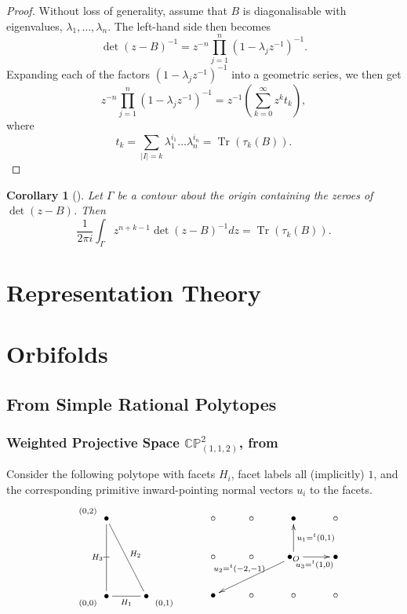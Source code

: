\documentclass{article}
\newtheorem{corollary}[theorem]{Corollary}
\newcommand{\PP}{\mathbb{P}}
\newcommand{\CC}{\mathbb{C}}
\newcommand{\pbrackets}[1]{\left( #1 \right)}
\DeclareMathOperator{\Tr}{Tr}
\begin{document}
	\begin{proof}
		Without loss of generality, assume that $B$ is diagonalisable with eigenvalues, $\lambda_{1}, \ldots, \lambda_{n}$. The left-hand side then becomes
		\begin{equation*}
			\det(z - B)^{-1} = z^{-n}\prod\limits_{j = 1}^{n}(1 - \lambda_{j}z^{-1})^{-1}.
		\end{equation*}
		Expanding each of the factors $(1 - \lambda_{j}z^{-1})^{-1}$ into a geometric series, we then get
		\begin{equation*}
			z^{-n}\prod\limits_{j = 1}^{n}(1 - \lambda_{j}z^{-1})^{-1} = z^{-1}\left( \sum_{k = 0}^{\infty} z^{k}t_{k} \right),
		\end{equation*}
		where
		\begin{equation*}
			t_{k} = \sum_{|I| = k} \lambda_{1}^{i_{1}}\ldots\lambda_{n}^{i_{n}} = \Tr\pbrackets{\tau_{k}(B)}.
		\end{equation*}
	\end{proof}
	
	\begin{corollary}[\cite{CanasdaSilva1996}]\label{residue:4}
		Let $\Gamma$ be a contour about the origin containing the zeroes of $\det(z - B)$. Then
		\begin{equation*}
			\frac{1}{2\pi i} \int_{\Gamma} z^{n + k -1} \det(z - B)^{-1} dz = \Tr\pbrackets{\tau_{k}(B)}.
		\end{equation*}
	\end{corollary}

	\section{Representation Theory}
	
	\section{Orbifolds}
	\subsection{From Simple Rational Polytopes}
	\subsubsection{Weighted Projective Space $\CC\PP^2_{(1,1,2)}$, from \cite{Holm2012}}
	Consider the following polytope with facets $H_i$, facet labels all (implicitly) $1$, and the corresponding primitive inward-pointing normal vectors $u_i$ to the facets.{\tiny
		\[
		\xymatrix{ 
			\ar@{}[r]^{(0,2)}&\bullet\ar@{-}[dd]_{H_3}\ar@{-}[rdd]^{H_2}&&\\
			&-&&\\
			\ar@{}[r]_{(0,0)}&\bullet\ar@{-}[r]_{H_1}&\bullet \ar@{}[r]_{(0,1)}&
		}
		\ \ \ \ \ \ 
		\xymatrix{
			\circ&\circ&\bullet&\circ\\
			\circ&\circ&\bullet_O\ar[u]_{u_1=^t(0,1) }\ar[r]_{u_3=^t(1,0) }\ar[dll]_{u_2=^t(-2,-1)}&\bullet\\
			\bullet&\circ&\circ&\circ
		}
		\]
	}
	
\end{document}
